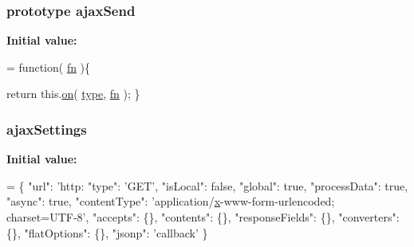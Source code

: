 \subsubsection[{ajax\+Send}]{ {\bf prototype} ajax\+Send}\label{jquery-1_810_82-vsdoc_8js_a558f714e59e1575482b9dce5b917a905}
{\bfseries Initial value\+:}
\begin{DoxyCode}
= \textcolor{keyword}{function}( \hyperlink{jquery-1_810_82-vsdoc_8js_acef6bdaf6b9b20fdcca1ea86f0902c3b}{fn} )\{


        \textcolor{keywordflow}{return} this.\hyperlink{jquery-1_810_82-vsdoc_8js_ae453b412b883f60220d73468ef6c6dbc}{on}( \hyperlink{jquery-1_810_82-vsdoc_8js_a3940565e83a9bfd10d95ffd27536da91}{type}, \hyperlink{jquery-1_810_82-vsdoc_8js_acef6bdaf6b9b20fdcca1ea86f0902c3b}{fn} );
    \}
\end{DoxyCode}
\hypertarget{jquery-1_810_82-vsdoc_8js_adcbb4ce9148aaf3a9a165b2ac462163b}{}
\subsubsection[{ajax\+Settings}]{ ajax\+Settings}\label{jquery-1_810_82-vsdoc_8js_adcbb4ce9148aaf3a9a165b2ac462163b}
{\bfseries Initial value\+:}
\begin{DoxyCode}
= \{ \textcolor{stringliteral}{"url"}: \textcolor{stringliteral}{'http:}
\textcolor{stringliteral}{"type": '}GET\textcolor{stringliteral}{',}
\textcolor{stringliteral}{"isLocal": false,}
\textcolor{stringliteral}{"global": true,}
\textcolor{stringliteral}{"processData": true,}
\textcolor{stringliteral}{"async": true,}
\textcolor{stringliteral}{"contentType": '}application/\hyperlink{_bibabook_2_scripts_2jquery-1_810_82_8min_8js_a5ce50d751c9664d05375c8f5080ed43e}{x}-www-form-urlencoded; charset=UTF-8\textcolor{stringliteral}{',}
\textcolor{stringliteral}{"accepts": \{\},}
\textcolor{stringliteral}{"contents": \{\},}
\textcolor{stringliteral}{"responseFields": \{\},}
\textcolor{stringliteral}{"converters": \{\},}
\textcolor{stringliteral}{"flatOptions": \{\},}
\textcolor{stringliteral}{"jsonp": '}callback\textcolor{stringliteral}{' \}}
\end{DoxyCode}
\hypertarget{jquery-1_810_82-vsdoc_8js_a3b12f4f2a83dfdae4e81bcaeaf2a2f42}{}
